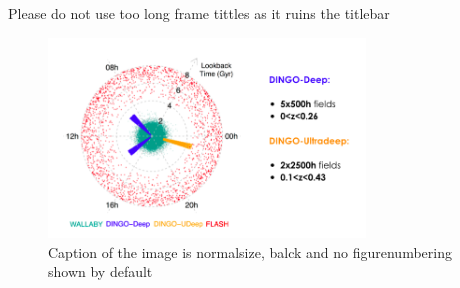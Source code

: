 \documentclass[9pt,t]{beamer} %
\begin{document}
\begin{frame}{Please do not use too long frame tittles as it ruins the titlebar} %
  \begin{figure}[H]
    \centering
    \centerline{
    \includegraphics[width=0.75\textwidth]{logos/askap_hi_surveys_meyer.png}
    }
    \caption{Caption of the image is normalsize, balck and no figurenumbering shown by default}
  \end{figure}
\end{frame}
\end{document}
